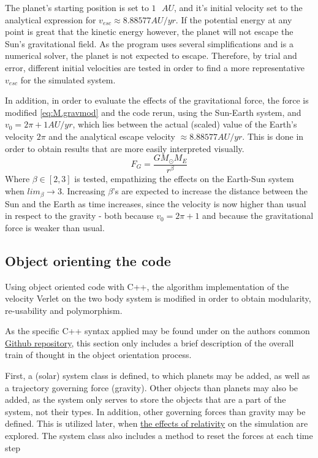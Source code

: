 \documentclass[%
oneside,                 %
final,                   %
10pt]{article}
\begin{document}
The planet's starting position is set to $1 \text{ } AU$, and it's initial velocity set to the analytical expression for $v_{esc} \approx 8.88577 AU/yr$. If the potential energy at any point is great that the kinetic energy however, the planet will not escape the Sun's gravitational field. As the program uses several simplifications and is a numerical solver, the planet is not expected to escape. Therefore, by trial and error, different initial velocities are tested in order to find a more representative $v_{esc}$ for the simulated system.\newline

In addition, in order to evaluate the effects of the gravitational force, the force is modified \eqref{eq:M.gravmod} and the code rerun, using the Sun-Earth system, and $v_0=2\pi+1 AU/yr$, which lies between the actual (scaled) value of the Earth's velocity $2\pi$ and the analytical escape velocity $ \approx 8.88577 AU/yr$. This is done in order to obtain results that are more easily interpreted visually.
\begin{equation}
F_G=\frac{GM_{\odot}M_{E}}{r^{\beta}}
\label{eq:M.gravmod}
\end{equation}
Where $\beta \in [2,3]$ is tested, empathizing the effects on the Earth-Sun system when $lim_{\beta} \rightarrow 3$. Increasing $\beta$'s are expected to increase the distance between the Sun and the Earth as time increases, since the velocity is now higher than usual in respect to the gravity - both because $v_0=2\pi+1$ and because the gravitational force is weaker than usual.

 
\subsection{Object orienting the code}  
\label{sec:OOing}
Using object oriented code with C++, the algorithm implementation of the velocity Verlet on the two body system is modified in order to obtain modularity, re-usability and polymorphism.  \newline

As the specific C++ syntax applied may be found under on the authors common \href{https://github.com/johanere/CP3}{Github repository}, this section only includes a brief description of the overall train of thought in the object orientation process. \newline

First, a (solar) system class is defined, to which planets may be added, as well as a trajectory governing force (gravity). Other objects than planets may also be added, as the system only serves to store the objects that are a part of the system, not their types. In addition, other governing forces than gravity may be defined. This is utilized later, when \hyperref[sec:M.effectsofrel]{the effects of relativity} on the simulation are explored. The system class also includes a method to reset the forces at each time step\newline
\end{document}
